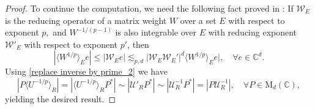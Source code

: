 \documentclass{article}
\theoremstyle{definition}
\theoremstyle{remark}
\numberwithin{equation}{section}
\newcommand{\cU}{\mathcal{U}}
\newcommand{\cW}{\mathcal{W}}
\newcommand{\complex}{\mathbb{C}}
\newcommand{\1}{\mathbf{1}}
\begin{document}
\begin{proof}
        To continue the computation, we need the following fact proved in \cite[Lemma 2.2]{Isralowitz_Kwon_Pott2017}: If $\cW_{E}$ is the reducing operator of a matrix weight $W$ over a set $E$ with respect to exponent $p,$ and $W^{-1/(p-1)}$ is also integrable over $E$ with reducing exponent $\cW'_{E}$ with respect to exponent $p'$, then
        \begin{equation}
            \label{replace inverse by prime_2}
            |{\langle W^{1/p}\rangle}_{E} e|\leq
            |\cW_{E} e|\lesssim_{p,d}|\cW_{E}\cW_{E}'|^{d}{\langle W^{1/p}\rangle}_{E} e|,\quad\forall e\in\complex^{d}.
        \end{equation}
        Using \eqref{replace inverse by prime_2} we have
        \begin{equation*}
            |P\langle U^{-1/p}\rangle_{R}|=|\langle U^{-1/p}\rangle_{R}P^{\ast}|\sim|\cU'_{R}P^{*}|\sim|\cU^{-1}_{R}P^{*}|=|P\cU^{-1}_{R}|,\quad\forall P\in \mathrm{M}_{d}(\complex),
        \end{equation*}
        yielding the desired result.


\end{proof}
\end{document}

